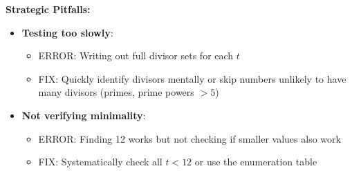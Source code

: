 \documentclass[]{article}
\begin{document}
\begin{roadmapbox}
\textbf{Strategic Pitfalls:}
\begin{itemize}[leftmargin=*]
    \item \textbf{Testing too slowly}:
    \begin{itemize}
        \item ERROR: Writing out full divisor sets for each $t$
        \item FIX: Quickly identify divisors mentally or skip numbers unlikely to have many divisors (primes, prime powers $> 5$)
    \end{itemize}
    \item \textbf{Not verifying minimality}:
    \begin{itemize}
        \item ERROR: Finding 12 works but not checking if smaller values also work
        \item FIX: Systematically check all $t < 12$ or use the enumeration table
    \end{itemize}
\end{itemize}
\end{roadmapbox}
\end{document}
